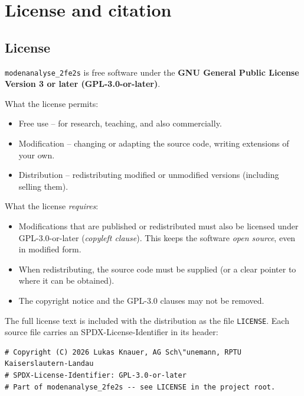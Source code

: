 \documentclass[11pt,a4paper,twoside]{article}
\theoremstyle{remark}
\begin{document}
\section{License and citation}
\label{sec:lizenz}

\subsection{License}

\texttt{modenanalyse\_2fe2s} is free software under the
\textbf{GNU General Public License Version 3 or later (GPL-3.0-or-later)}.

What the license permits:

\begin{itemize}
  \item Free use -- for research, teaching, and also commercially.
  \item Modification -- changing or adapting the source code,
        writing extensions of your own.
  \item Distribution -- redistributing modified or unmodified
        versions (including selling them).
\end{itemize}

What the license \emph{requires}:

\begin{itemize}
  \item Modifications that are published or redistributed must
        also be licensed under GPL-3.0-or-later
        (\emph{copyleft clause}). This keeps the software
        \emph{open source}, even in modified form.
  \item When redistributing, the source code must be supplied (or
        a clear pointer to where it can be obtained).
  \item The copyright notice and the GPL-3.0 clauses may not be
        removed.
\end{itemize}

The full license text is included with the distribution as the
file \texttt{LICENSE}. Each source file carries an
SPDX-License-Identifier in its header:

\begin{lstlisting}[style=python]
# Copyright (C) 2026 Lukas Knauer, AG Sch\"unemann, RPTU Kaiserslautern-Landau
# SPDX-License-Identifier: GPL-3.0-or-later
# Part of modenanalyse_2fe2s -- see LICENSE in the project root.
\end{lstlisting}
\end{document}
